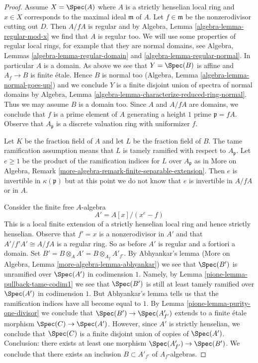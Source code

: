 \begin{proof}
\medskip\noindent
Assume $X = \Spec(A)$ where $A$ is a strictly henselian local ring
and $x \in X$ corresponds to the maximal ideal $\mathfrak m$ of $A$.
Let $f \in \mathfrak m$ be the nonzerodivisor cutting out $D$.
Then $A/fA$ is regular and by Algebra, Lemma \ref{algebra-lemma-regular-mod-x}
we find that $A$ is regular too. We will use some properties of regular
local rings, for example that they are normal domains, see
Algebra, Lemmas \ref{algebra-lemma-regular-domain} and
\ref{algebra-lemma-regular-normal}. In particular $A$ is a domain.
As above we see that $Y = \Spec(B)$ is affine and $A_f \to B$
is finite \'etale. Hence $B$ is normal too
(Algebra, Lemma \ref{algebra-lemma-normal-goes-up})
and we conclude $Y$ is a finite disjoint union of spectra of normal domains by
Algebra, Lemma \ref{algebra-lemma-characterize-reduced-ring-normal}.
Thus we may assume $B$ is a domain too.
Since $A$ and $A/fA$ are domains, we conclude that $f$ is a prime
element of $A$ generating a height $1$ prime $\mathfrak p = fA$.
Observe that $A_\mathfrak p$ is a discrete valuation ring with uniformizer $f$.

\medskip\noindent
Let $K$ be the fraction field of $A$ and let $L$ be the fraction
field of $B$. The tame ramification assumption means that
$L$ is tamely ramified with respect to $A_\mathfrak p$.
Let $e \geq 1$ be the product of the ramification indices for $L$
over $A_\mathfrak p$ as in
More on Algebra, Remark \ref{more-algebra-remark-finite-separable-extension}.
Then $e$ is invertible in $\kappa(\mathfrak p)$ but
at this point we do not know that $e$ is invertible in $A/fA$
or in $A$.

\medskip\noindent
Consider the finite free $A$-algebra
$$
A' = A[x]/(x^e - f)
$$
This is a local finite extension of a strictly henselian local
ring and hence strictly henselian.
Observe that $f' = x$ is a nonzerodivisor in $A'$ and that
$A'/f'A' \cong A/fA$ is a regular ring. So as before $A'$
is regular and a fortiori a domain. Set
$B' = B \otimes_A A' = B \otimes_{A_f} A'_{f'}$.
By Abhyankar's lemma
(More on Algebra, Lemma \ref{more-algebra-lemma-abhyankar})
we see that $\Spec(B')$ is unramified over $\Spec(A')$
in codimension $1$. Namely, by Lemma \ref{pione-lemma-pullback-tame-codim1}
we see that $\Spec(B')$ is still at least tamely ramified
over $\Spec(A')$ in codimension $1$. But Abhyankar's lemma
tells us that the ramification indices have all become equal to $1$.
By Lemma \ref{pione-lemma-purity-one-divisor} we conclude that
$\Spec(B') \to \Spec(A'_{f'})$ extends to a finite \'etale morphism
$\Spec(C) \to \Spec(A')$. However, since $A'$ is strictly henselian,
we conclude that $\Spec(C)$ is a finite disjoint union of copies
of $\Spec(A')$. Conclusion: there exists at least one morphism
$\Spec(A'_{f'}) \to \Spec(B')$. We conclude that there exists
an inclusion $B \subset A'_{f'}$ of $A_f$-algebras.


\end{proof}
